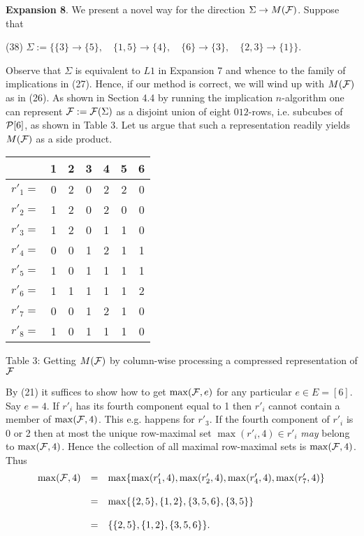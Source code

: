 \documentclass[11pt]{article}
\newcommand{\ra}{\rightarrow}
\begin{document}
{\bf Expansion 8}. We present a novel way for the direction $\Sigma \ra M({\cal F})$. 
Suppose that

(38) \quad $\Sigma := \{\{3\} \ra \{5\}, \quad \{1, 5\} \ra \{4\}, \quad \{6\} \ra \{3\}, \quad \{2, 3\} \ra \{1\}\}.$

Observe that $\Sigma$ is equivalent to $L1$ in Expansion 7 and whence to the family of implications in (27). Hence, if our method is correct, we will wind up with $M({\cal F})$ as in (26). As shown in
Section 4.4 by running the implication $n$-algorithm one can represent ${\cal F} := {\cal F}(\Sigma)$ as a disjoint union of eight $012$-rows, i.e. subcubes of ${\cal P}[6]$, as shown in Table 3. Let us argue that such a representation readily yields $M({\cal F})$ as a side product. 

\begin{tabular}{c|c|c|c|c|c|c|} 
& 1 & 2& 3& 4& 5& 6 \\ \hline
$r'_1=$ & 0 & 2& 0 &2 & 2& 0 \\ \hline
$r'_2 =$ & 1 &2 & 0 & 2 & 0 & 0 \\ \hline
$r'_3=$ & 1 & 2& 0 & 1& 1& 0 \\ \hline
$r'_4=$ & 0 & 0 & 1 & 2 & 1 & 1 \\ \hline
$r'_5 =$ & 1 & 0 & 1 & 1 & 1 &1 \\ \hline
$r'_6=$ & 1 & 1 & 1& 1 & 1& 2 \\ \hline
$r'_7=$ & 0 & 0 & 1 & 2& 1& 0 \\ \hline
$r'_8=$ & 1 & 0 & 1 & 1 & 1 &0 \\ \hline \end{tabular}

Table 3: Getting $M({\cal F})$ by column-wise processing a compressed representation of ${\cal F}$

By (21) it suffices to show how to get $\max ({\cal F}, e)$ for any particular $e \in E = [6]$. Say $e=4$.  If $r'_i$ has its fourth component equal to 1 then $r'_i$ cannot contain a member of $\max({\cal F},4)$. This e.g. happens for $r'_3$. If the fourth component of $r'_i$ is 0 or 2 then at most the unique row-maximal set $\max (r'_i, 4) \in r'_i$ {\it may} belong to $\max ({\cal F}, 4)$. Hence the collection of all maximal row-maximal sets is $\max ({\cal F}, 4)$. Thus
$$\begin{array}{lll}
\max({\cal F}, 4) & =& \max \{\max (r'_1, 4), \max (r'_2, 4), \max (r'_4, 4), \max (r'_7, 4) \} \\
\\
& =& \max \{\{2, 5\}, \{1, 2\}, \{3, 5, 6\}, \{3, 5\}\}\\
\\
& = & \{\{2, 5\}, \{1, 2\}, \{3, 5, 6\} \}. \end{array}$$
\end{document}
